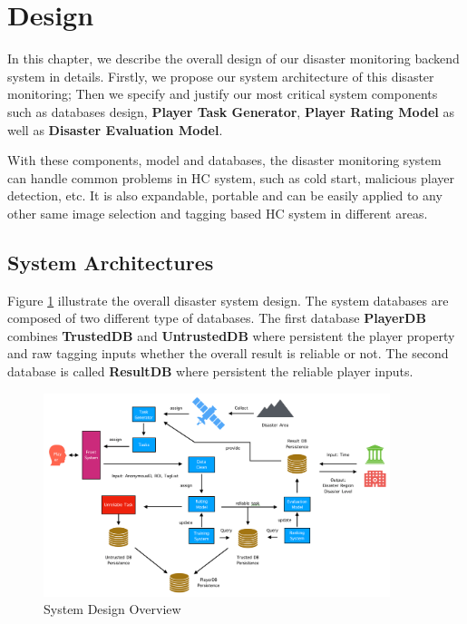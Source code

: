 \section{Design}

In this chapter, we describe the overall design of our disaster monitoring backend system in details.
Firstly, we propose our system architecture of this disaster monitoring;
Then we specify and justify our most critical system components such as databases design, 
\textbf{Player Task Generator}, \textbf{Player Rating Model} as well as \textbf{Disaster Evaluation Model}.

With these components, model and databases, the disaster monitoring system can handle
common problems in HC system, such as cold start, malicious player detection, etc. 
It is also expandable, portable and can be easily applied to any other same image selection 
and tagging based HC system in different areas.

\subsection{System Architectures}

Figure \ref{fig:arch} illustrate the overall disaster system design.
The system databases are composed of two different type of databases. 
The first database \textbf{PlayerDB} combines \textbf{TrustedDB} and \textbf{UntrustedDB} 
where persistent the player property and raw tagging inputs whether the overall result is reliable or not.
The second database is called \textbf{ResultDB} where persistent the reliable player inputs.

\begin{figure}[htp]
\centering
\includegraphics[width=0.9\textwidth]{figures/system2}
\caption{System Design Overview}
\label{fig:arch}
\end{figure}

